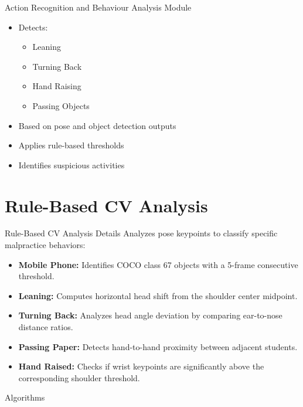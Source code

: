 \documentclass{beamer}
\begin{document}
\begin{frame}{Action Recognition and Behaviour Analysis Module}
\begin{itemize}
    \item Detects:
    \begin{itemize}
        \item Leaning
        \item Turning Back
        \item Hand Raising
        \item Passing Objects
    \end{itemize}
    \item Based on pose and object detection outputs
    \item Applies rule-based thresholds
    \item Identifies suspicious activities
\end{itemize}
\end{frame}

\section{Rule-Based CV Analysis}
\begin{frame}{Rule-Based CV Analysis Details}
Analyzes pose keypoints to classify specific malpractice behaviors:
\begin{itemize}
    \item \textbf{Mobile Phone:} Identifies COCO class 67 objects with a 5-frame consecutive threshold.
    \item \textbf{Leaning:} Computes horizontal head shift from the shoulder center midpoint.
    \item \textbf{Turning Back:} Analyzes head angle deviation by comparing ear-to-nose distance ratios.
    \item \textbf{Passing Paper:} Detects hand-to-hand proximity between adjacent students.
    \item \textbf{Hand Raised:} Checks if wrist keypoints are significantly above the corresponding shoulder threshold.
\end{itemize}
\end{frame}

\begin{frame}{}
    \centering
    \Huge Algorithms
\end{frame}
\end{document}
